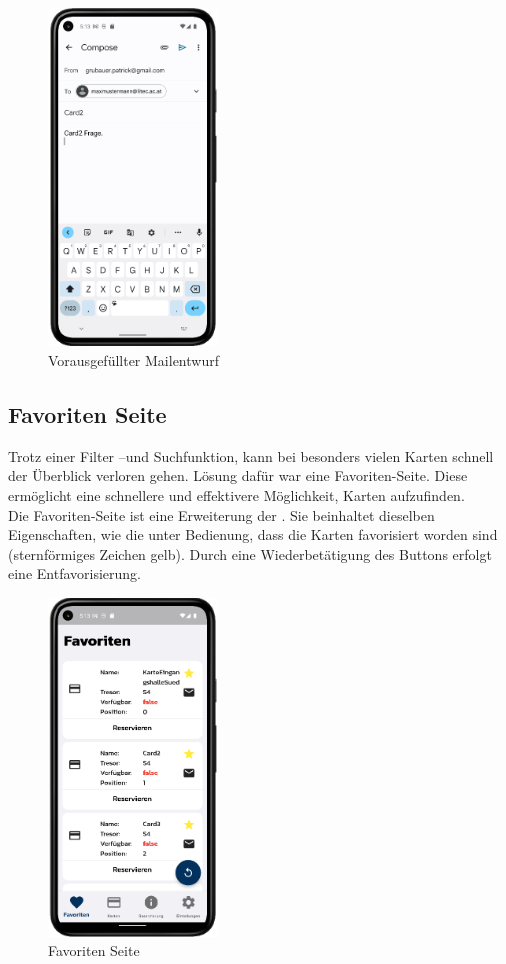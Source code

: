 \begin{figure}[!h]
\centering
\includegraphics[width=0.4\textwidth]{FLUTTER/images/GP/Cleint_Send_Mail.png}
\caption{Vorausgefüllter Mailentwurf}
\end{figure}

\newpage
\subsection{Favoriten Seite}
Trotz einer Filter –und Suchfunktion, kann bei besonders vielen Karten schnell der Überblick verloren gehen. Lösung dafür war eine Favoriten-Seite. Diese ermöglicht eine schnellere und effektivere Möglichkeit, Karten aufzufinden.\\ 
Die Favoriten-Seite ist eine Erweiterung der . Sie beinhaltet dieselben Eigenschaften, wie die  unter Bedienung, dass die Karten favorisiert worden sind (sternförmiges Zeichen gelb). Durch eine Wiederbetätigung des Buttons erfolgt eine Entfavorisierung.
\begin{figure}[!h]
\centering
\includegraphics[width=0.4\textwidth]{FLUTTER/images/GP/Client_Favorite.png}
\caption{Favoriten Seite}
\end{figure}



